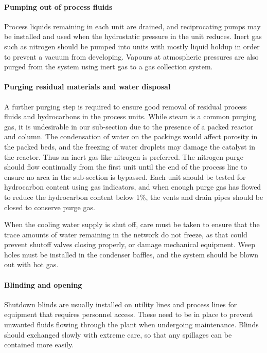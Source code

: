 \paragraph{Pumping out of process fluids}
Process liquids remaining in each unit are drained, and reciprocating pumps may be installed and used when the hydrostatic pressure in the unit reduces. Inert gas such as nitrogen should be pumped into units with mostly liquid holdup in order to prevent a vacuum from developing. Vapours at atmospheric pressures are also purged from the system using inert gas to a gas collection system.

\paragraph{Purging residual materials and water disposal}
A further purging step is required to ensure good removal of residual process fluids and hydrocarbons in the process units. While steam is a common purging gas, it is undesirable in our sub-section due to the presence of a packed reactor and column. The condensation of water on the packings would affect porosity in the packed beds, and the freezing of water droplets may damage the catalyst in the reactor. Thus an inert gas like nitrogen is preferred. The nitrogen purge should flow continually from the first unit until the end of the process line to ensure no area in the sub-section is bypassed. Each unit should be tested for hydrocarbon content using gas indicators, and when enough purge gas has flowed to reduce the hydrocarbon content below 1\%, the vents and drain pipes should be closed to conserve purge gas. 

When the cooling water supply is shut off, care must be taken to ensure that the trace amounts of water remaining in the network do not freeze, as that could prevent shutoff valves closing properly, or damage mechanical equipment. Weep holes must be installed in the condenser baffles, and the system should be blown out with hot gas.

\paragraph{Blinding and opening}
Shutdown blinds are usually installed on utility lines and process lines for equipment that requires personnel access. These need to be in place to prevent unwanted fluids flowing through the plant when undergoing maintenance. Blinds should exchanged slowly with extreme care, so that any spillages can be contained more easily. 

